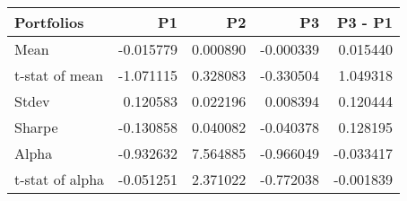 \begin{tabular}{lrrrr}
\toprule
Portfolios & P1 & P2 & P3 & P3 - P1 \\
\midrule
Mean & -0.015779 & 0.000890 & -0.000339 & 0.015440 \\
t-stat of mean & -1.071115 & 0.328083 & -0.330504 & 1.049318 \\
Stdev & 0.120583 & 0.022196 & 0.008394 & 0.120444 \\
Sharpe & -0.130858 & 0.040082 & -0.040378 & 0.128195 \\
Alpha & -0.932632 & 7.564885 & -0.966049 & -0.033417 \\
t-stat of alpha & -0.051251 & 2.371022 & -0.772038 & -0.001839 \\
\bottomrule
\end{tabular}
